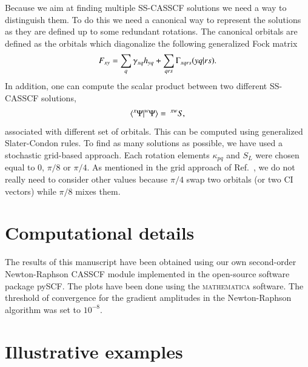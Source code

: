 \documentclass[aps,prb,reprint,showkeys,superscriptaddress]{revtex4-1}
\begin{document}
Because we aim at finding multiple SS-CASSCF solutions we need a way to distinguish them.
To do this we need a canonical way to represent the solutions as they are defined up to some redundant rotations. \cite{Helgaker_2000}
The canonical orbitals are defined as the orbitals which diagonalize the following generalized Fock matrix
\begin{equation}
  \label{eq:general_fock}
  F_{xy} = \sum_q \gamma_{xq}h_{yq} + \sum_{qrs} \Gamma_{xqrs}\ceri{yq}{rs}.
\end{equation}
In addition, one can compute the scalar product between two different SS-CASSCF solutions,
\begin{equation}
  \label{eq:scalprod}
  \braket{^x\Psi}{^w\Psi} =~^{xw}S,
\end{equation}
associated with different set of orbitals. This can be computed using generalized Slater-Condon rules. \cite{Burton_2021a}
To find as many solutions as possible, we have used a stochastic grid-based approach.
Each rotation elements $\kappa_{pq}$ and $S_{L}$ were chosen equal to $0$, $\pi/8$ or $\pi/4$.
As mentioned in the grid approach of Ref.~, we do not really need to consider other values because $\pi/4$ swap two orbitals (or two CI vectors) while $\pi/8$ mixes them.

\section{Computational details}
\label{sec:comp_details}

The results of this manuscript have been obtained using our own second-order Newton-Raphson CASSCF module implemented in the open-source software package pySCF. \cite{Sun_2020}
The plots have been done using the \textsc{mathematica} software. \cite{Mathematica}
The threshold of convergence for the gradient amplitudes in the Newton-Raphson algorithm was set to $10^{-8}$.

\section{Illustrative examples}
\label{sec:illustrative}
\end{document}
